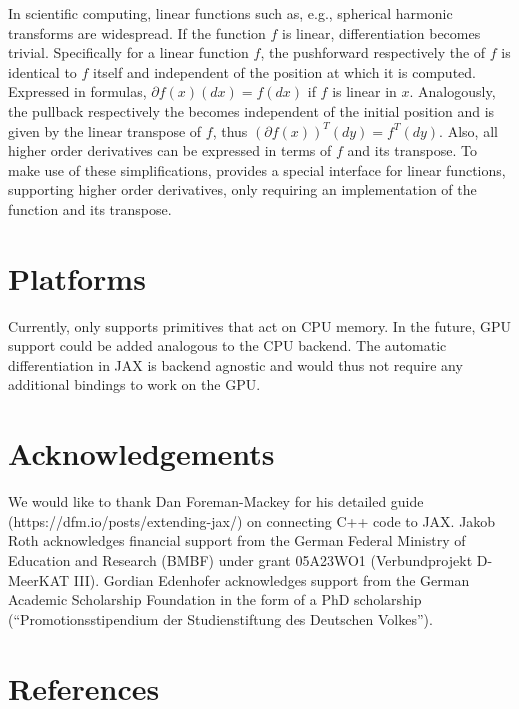 \documentclass[10pt,a4paper,onecolumn]{article}
\let\textttOrig=\texttt
\def\texttt#1{\expandafter\textttOrig{\seqsplit{#1}}}
\let\addcontentslineOrig=\addcontentsline
\def\addcontentsline#1#2#3{\bgroup
  \let\texttt=\textttOrig\addcontentslineOrig{#1}{#2}{#3}\egroup}
\begin{document}
In scientific computing, linear functions such as, e.g., spherical
harmonic transforms are widespread. If the function \(f\) is linear,
differentiation becomes trivial. Specifically for a linear function
\(f\), the pushforward respectively the \texttt{jvp} of \(f\) is
identical to \(f\) itself and independent of the position at which it is
computed. Expressed in formulas, \(\partial f(x)(dx) = f(dx)\) if \(f\)
is linear in \(x\). Analogously, the pullback respectively the
\texttt{vjp} becomes independent of the initial position and is given by
the linear transpose of \(f\), thus
\((\partial f(x))^{T}(dy) = f^T(dy)\). Also, all higher order
derivatives can be expressed in terms of \(f\) and its transpose. To
make use of these simplifications, \texttt{JAXbind} provides a special
interface for linear functions, supporting higher order derivatives,
only requiring an implementation of the function and its transpose.

\hypertarget{platforms}{%
\section{Platforms}\label{platforms}}

Currently, \texttt{JAXbind} only supports primitives that act on CPU
memory. In the future, GPU support could be added analogous to the CPU
backend. The automatic differentiation in JAX is backend agnostic and
would thus not require any additional bindings to work on the GPU.

\hypertarget{acknowledgements}{%
\section{Acknowledgements}\label{acknowledgements}}

We would like to thank Dan Foreman-Mackey for his detailed guide
(https://dfm.io/posts/extending-jax/) on connecting C++ code to JAX.
Jakob Roth acknowledges financial support from the German Federal
Ministry of Education and Research (BMBF) under grant 05A23WO1
(Verbundprojekt D-MeerKAT III). Gordian Edenhofer acknowledges support
from the German Academic Scholarship Foundation in the form of a PhD
scholarship (``Promotionsstipendium der Studienstiftung des Deutschen
Volkes'').

\hypertarget{references}{%
\section*{References}\label{references}}
\end{document}
